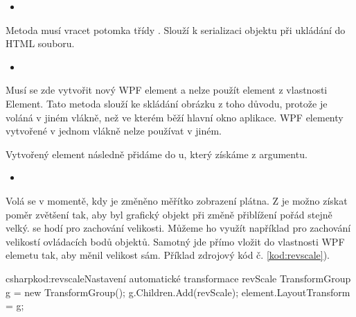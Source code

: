 \documentclass[
  field=inf,
  biblatex,
  glossaries,
  index
]{kidiplom}
\begin{document}
\begin{itemize}
\item {}
\end{itemize}
Metoda musí vracet potomka třídy . Slouží k serializaci objektu při ukládání do HTML souboru.

\begin{itemize}
\item {}
\end{itemize}
Musí se zde vytvořit nový WPF element a nelze použít element z vlastnosti Element. Tato metoda slouží ke skládání obrázku z toho důvodu, protože je voláná v jiném vlákně, než ve kterém běží hlavní okno aplikace. WPF elementy vytvořené v jednom vlákně nelze používat v jiném.

Vytvořený element následně přidáme do u, který získáme z argumentu.

\begin{itemize}
\item {}
\end{itemize}

Volá se v momentě, kdy je změněno měřítko zobrazení plátna. Z  je možno získat poměr zvětšení tak, aby byl grafický objekt při změně přiblížení pořád stejně velký.  se hodí pro zachování velikosti. Můžeme ho využít například pro zachování velikostí ovládacích bodů objektů. Samotný  jde přímo vložit do vlastnosti WPF elemetu tak, aby měnil velikost sám. Příklad zdrojový kód č. \ref{kod:revscale}).

\begin{kicode}{csharp}{kod:revscale}{Nastavení automatické transformace revScale}
TransformGroup g = new TransformGroup();
g.Children.Add(revScale);
element.LayoutTransform = g;
\end{kicode}
\end{document}
